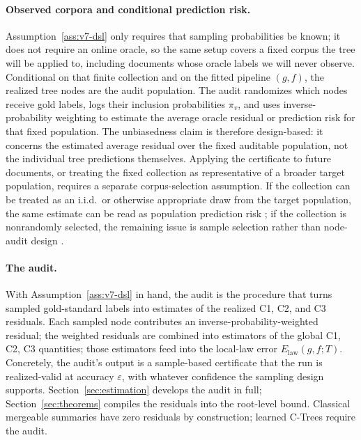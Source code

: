 \paragraph{Observed corpora and conditional prediction risk.}
Assumption~\ref{ass:v7-dsl} only requires that sampling probabilities
be known; it does not require an online oracle, so the same setup
covers a fixed corpus the tree will be applied to, including
documents whose oracle labels we will never observe. Conditional on that finite collection and on the fitted
pipeline \((g,f)\), the realized tree nodes are the audit population.
The audit randomizes which nodes receive gold labels, logs their
inclusion probabilities \(\pi_v\), and uses inverse-probability
weighting to estimate the average oracle residual or prediction risk
for that fixed population. The unbiasedness claim is therefore
design-based: it concerns the estimated average residual over the
fixed auditable population, not the individual tree predictions
themselves. Applying the certificate to future documents, or treating
the fixed collection as representative of a broader target population,
requires a separate corpus-selection assumption. If the collection can
be treated as an i.i.d.\ or otherwise appropriate draw from the target
population, the same estimate can be read as population prediction
risk \citep{Wooldridge2010}; if the collection is nonrandomly selected,
the remaining issue is sample selection rather than node-audit design
\citep{Heckman1979,Manski1989Selection}.

\paragraph{The audit.}
With Assumption~\ref{ass:v7-dsl} in hand, the audit is the procedure
that turns sampled gold-standard labels into estimates of the realized
C1, C2, and C3 residuals. Each sampled node contributes an
inverse-probability-weighted residual; the weighted residuals are
combined into estimators of the global C1, C2, C3 quantities; those
estimators feed into the local-law error \(E_{\mathrm{law}}(g,f;T)\).
Concretely, the audit's output is a sample-based certificate that the
run is realized-valid at accuracy \(\varepsilon\), with whatever
confidence the sampling design supports.
Section~\ref{sec:estimation} develops the audit in full;
Section~\ref{sec:theorems} compiles the residuals into the root-level
bound. Classical mergeable summaries have zero residuals by
construction; learned C-Trees require the audit.

